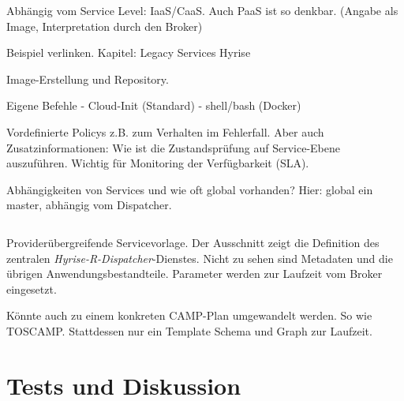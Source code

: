 Abhängig vom Service Level: IaaS/CaaS. Auch PaaS ist so denkbar. (Angabe als Image, Interpretation durch den Broker)

Beispiel verlinken.
Kapitel: Legacy Services Hyrise

Image-Erstellung und Repository.

Eigene Befehle
- Cloud-Init (Standard)
- shell/bash (Docker)

Vordefinierte Policys z.B. zum Verhalten im Fehlerfall. Aber auch Zusatzinformationen: Wie ist die Zustandsprüfung auf Service-Ebene auszuführen. Wichtig für Monitoring der Verfügbarkeit (SLA).

Abhängigkeiten von Services und wie oft global vorhanden? Hier: global ein master, abhängig vom Dispatcher.

\begin{listing}[]	
	\inputminted[firstline=15]{yaml}{./src/hyrise-r.sample.yaml}
	\caption{Providerübergreifende Servicevorlage. Der Ausschnitt zeigt die Definition des zentralen \emph{Hyrise-R-Dispatcher}-Dienstes. Nicht zu sehen sind Metadaten und die übrigen Anwendungsbestandteile. Parameter werden zur Laufzeit vom Broker eingesetzt.}
	\label{listing:hyrise-r}
\end{listing}

Könnte auch zu einem konkreten CAMP-Plan umgewandelt werden. So wie TOSCAMP. Stattdessen nur ein Template Schema und Graph zur Laufzeit.


\section{Tests und Diskussion}




